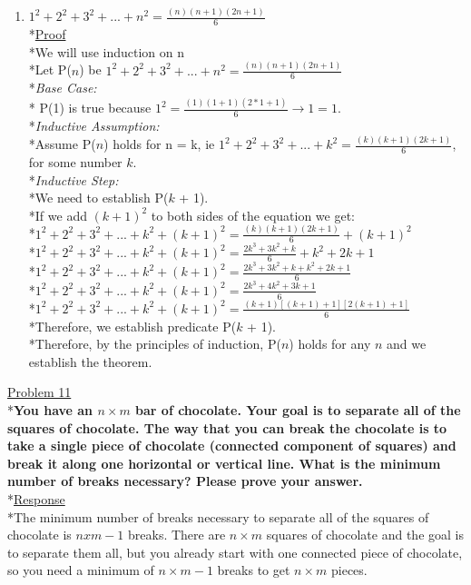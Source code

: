\documentclass[12pt]{article}
\begin{document}
\begin{enumerate}
	
	
	\item \textbf{$1^2+2^2+3^2+...+n^2=\frac{(n)(n+1)(2n+1)}{6}$}
	\medskip
	\\*\uline{Proof}
	\medskip
	\\*We will use induction on n
	\bigskip
	\\*Let P($n$) be $1^2 + 2^2 + 3^2 + ... + n^2 = \frac{(n)(n+1)(2n+1)}{6}$
	\bigskip
	\\*\textit{Base Case:}
	\\* P(1) is true because $1^2 = \frac{(1)(1+1)(2*1+1)}{6} \rightarrow 1 = 1$.
	\bigskip
	\\*\textit{Inductive Assumption:}
	\\*Assume P($n$) holds for n = k, ie $1^2 + 2^2 + 3^2 + ... + k^2 = \frac{(k)(k+1)(2k+1)}{6}$, for some number $k$. 
	\\*\textit{Inductive Step:}
	\\*We need to establish P($k$ + 1).
	\\*If we add $(k+1)^2$ to both sides of the equation we get:
	\\*$1^2 + 2^2 + 3^2 + ... + k^2 + (k+1)^2 = \frac{(k)(k+1)(2k+1)}{6} + (k+1)^2$
	\\*$1^2 + 2^2 + 3^2 + ... + k^2 + (k+1)^2 = \frac{2k^3 + 3k^2 + k}{6} + k^2 + 2k + 1$
	\\*$1^2 + 2^2 + 3^2 + ... + k^2 + (k+1)^2 = \frac{2k^3 + 3k^2 + k + k^2 + 2k + 1}{6}$
	\\*$1^2 + 2^2 + 3^2 + ... + k^2 + (k+1)^2 = \frac{2k^3 + 4k^2 + 3k + 1}{6}$
	\\*$1^2 + 2^2 + 3^2 + ... + k^2 + (k+1)^2 = \frac{(k+1)[(k+1) + 1][2(k+1) + 1]}{6}$
	\\*Therefore, we establish predicate P($k$ + 1).
	\bigskip
	\\*Therefore, by the principles of induction, P($n$) holds for any $n$ and we establish the theorem. 
\end{enumerate}
\bigskip



\noindent
\uline{Problem 11}
\\*\textbf{You have an $n\times m$ bar of chocolate. Your goal is to separate all of the squares of chocolate. The way that you can break the chocolate is to take a single piece of chocolate (connected component of squares) and break it along one horizontal  or vertical line. What is the minimum number of breaks necessary? Please prove your answer. }
\smallskip
\\*\uline{Response}
\\*The minimum number of breaks necessary to separate all of the squares of chocolate is $n x m - 1$ breaks. There are $n \times m$ squares of chocolate and the goal is to separate them all, but you already start with one connected piece of chocolate, so you need a minimum of $n \times m - 1$ breaks to get $n \times m$ pieces.
\bigskip
\end{document}

